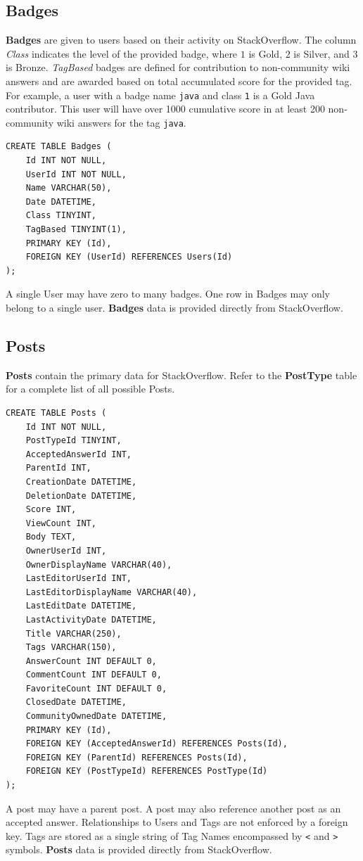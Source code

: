\documentclass[a4paper,11pt, notitlepage]{report}
\theoremstyle{definition}
\numberwithin{equation}{section}		%
\begin{document}
\subsection{Badges}
\textbf{Badges} are given to users based on their activity on StackOverflow. The column \textit{Class} indicates the level of the provided badge, where $1$ is Gold, $2$ is Silver, and $3$ is Bronze. \textit{TagBased} badges are defined for contribution to non-community wiki answers and are awarded based on total accumulated score for the provided tag. For example, a user with a badge name \texttt{java} and class \texttt{1} is a Gold Java contributor. This user will have over 1000 cumulative score in at least 200 non-community wiki answers for the tag \texttt{java}.
\begin{lstlisting}
CREATE TABLE Badges (
    Id INT NOT NULL,
    UserId INT NOT NULL,
    Name VARCHAR(50),
    Date DATETIME,
    Class TINYINT,
    TagBased TINYINT(1),
    PRIMARY KEY (Id),
    FOREIGN KEY (UserId) REFERENCES Users(Id)
);
\end{lstlisting}
A single User may have zero to many badges. One row in Badges may only belong to a single user. \textbf{Badges} data is provided directly from StackOverflow.

\subsection{Posts}
\textbf{Posts} contain the primary data for StackOverflow. Refer to the \textbf{PostType} table for a complete list of all possible Posts.
\begin{lstlisting}
CREATE TABLE Posts (
    Id INT NOT NULL,
    PostTypeId TINYINT,
    AcceptedAnswerId INT,
    ParentId INT,
    CreationDate DATETIME,
    DeletionDate DATETIME,
    Score INT,
    ViewCount INT,
    Body TEXT,
    OwnerUserId INT,
    OwnerDisplayName VARCHAR(40),
    LastEditorUserId INT,
    LastEditorDisplayName VARCHAR(40),
    LastEditDate DATETIME,
    LastActivityDate DATETIME,
    Title VARCHAR(250),
    Tags VARCHAR(150),
    AnswerCount INT DEFAULT 0,
    CommentCount INT DEFAULT 0,
    FavoriteCount INT DEFAULT 0,
    ClosedDate DATETIME,
    CommunityOwnedDate DATETIME,
    PRIMARY KEY (Id),
    FOREIGN KEY (AcceptedAnswerId) REFERENCES Posts(Id),
    FOREIGN KEY (ParentId) REFERENCES Posts(Id),
    FOREIGN KEY (PostTypeId) REFERENCES PostType(Id)
);
\end{lstlisting}
A post may have a parent post. A post may also reference another post as an accepted answer. Relationships to Users and Tags are not enforced by a foreign key. Tags are stored as a single string of Tag Names encompassed by \texttt{<} and \texttt{>} symbols. \textbf{Posts} data is provided directly from StackOverflow.
\end{document}
